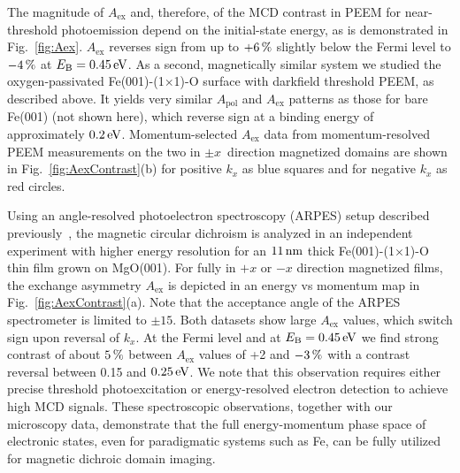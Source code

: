 \documentclass[prl,twocolumn,floatfix,superscriptaddress,aps]{revtex4-2}
\begin{document}
The magnitude of $A_{\mathrm{ex}}$ and, therefore, of the MCD contrast in PEEM for near-threshold photoemission depend on the initial-state energy, as is demonstrated in Fig.~\ref{fig:Aex}. $A_{\mathrm{ex}}$ reverses sign from up to $\unit[+6]{\%}$ slightly below the Fermi level to $\unit[-4]{\%}$ at $E_{\mathrm{B}} = \unit[0.45]{eV}$. 
As a second, magnetically similar system we studied the oxygen-passivated Fe(001)-(1$\times$1)-O surface with darkfield threshold PEEM, as described above. It yields very similar $A_{\mathrm{pol}}$ and $A_{\mathrm{ex}}$ patterns as those for bare Fe(001) (not shown here), which reverse sign at a binding energy of approximately $\unit[0.2]{eV}$. Momentum-selected $A_{\mathrm{ex}}$ data from momentum-resolved PEEM measurements on 
the two in $\pm x$\, direction magnetized domains are shown in Fig.~\ref{fig:AexContrast}(b) for positive $k_x$ as blue squares and for negative $k_x$ as red circles. 


Using an angle-resolved photoelectron spectroscopy (ARPES) setup described previously~\cite{gillmeister2018, gillmeister2020}, the magnetic circular dichroism is analyzed in an independent experiment with higher energy resolution for an $\unit[11]{nm}$ thick Fe(001)-(1$\times$1)-O thin film grown on MgO(001). For fully in $+x$ or $-x$ direction magnetized films, the exchange asymmetry $A_{\mathrm{ex}}$ is depicted in an energy vs momentum map in Fig.~\ref{fig:AexContrast}(a). Note that the acceptance angle of the ARPES spectrometer is limited to $\pm15$\textdegree. Both datasets show large $A_{\mathrm{ex}}$ values, which switch sign upon reversal of $k_x$. At the Fermi level and at $E_{\mathrm{B}} = \unit[0.45]{eV}$ we find strong contrast of about $\unit[5]{\%}$ between $A_{\mathrm{ex}}$ values of +2 and $\unit[-3]{\%}$ with a contrast reversal between 0.15 and $\unit[0.25]{eV}$. We note that this observation requires either precise threshold photoexcitation or energy-resolved electron detection to achieve high MCD signals.
These spectroscopic observations, together with our microscopy data, demonstrate that the full energy-momentum phase space of electronic states, even for paradigmatic systems such as Fe, can be fully utilized for magnetic dichroic domain imaging.
\end{document}

